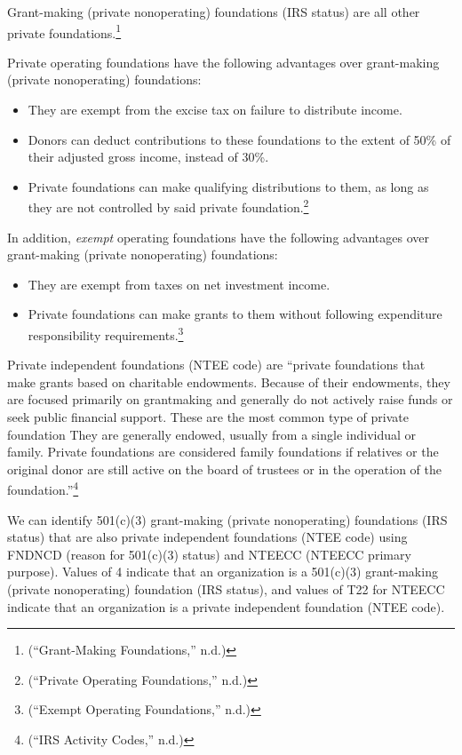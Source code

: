 \documentclass[
  letterpaper,
  DIV=11,
  numbers=noendperiod]{scrreprt}
\providecommand{\tightlist}{%
  \setlength{\itemsep}{0pt}\setlength{\parskip}{0pt}}\usepackage{longtable,booktabs,array}
\begin{document}
Grant-making (private nonoperating) foundations (IRS status) are all
other private foundations.\footnote{({``Grant-Making Foundations,''}
  n.d.)}

Private operating foundations have the following advantages over
grant-making (private nonoperating) foundations:

\begin{itemize}
\tightlist
\item
  They are exempt from the excise tax on failure to distribute income.
\item
  Donors can deduct contributions to these foundations to the extent of
  50\% of their adjusted gross income, instead of 30\%.
\item
  Private foundations can make qualifying distributions to them, as long
  as they are not controlled by said private foundation.\footnote{({``Private
    Operating Foundations,''} n.d.)}
\end{itemize}

In addition, \emph{exempt} operating foundations have the following
advantages over grant-making (private nonoperating) foundations:

\begin{itemize}
\tightlist
\item
  They are exempt from taxes on net investment income.
\item
  Private foundations can make grants to them without following
  expenditure responsibility requirements.\footnote{({``Exempt Operating
    Foundations,''} n.d.)}
\end{itemize}

Private independent foundations (NTEE code) are ``private foundations
that make grants based on charitable endowments. Because of their
endowments, they are focused primarily on grantmaking and generally do
not actively raise funds or seek public financial support. These are the
most common type of private foundation They are generally endowed,
usually from a single individual or family. Private foundations are
considered family foundations if relatives or the original donor are
still active on the board of trustees or in the operation of the
foundation.''\footnote{({``IRS Activity Codes,''} n.d.)}

We can identify 501(c)(3) grant-making (private nonoperating)
foundations (IRS status) that are also private independent foundations
(NTEE code) using FNDNCD (reason for 501(c)(3) status) and NTEECC
(NTEECC primary purpose). Values of 4 indicate that an organization is a
501(c)(3) grant-making (private nonoperating) foundation (IRS status),
and values of T22 for NTEECC indicate that an organization is a private
independent foundation (NTEE code).
\end{document}
